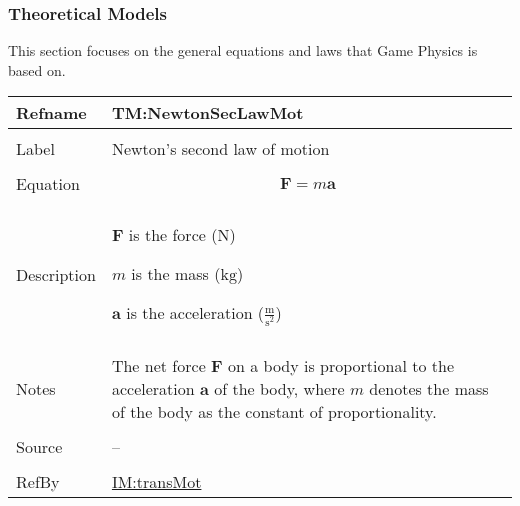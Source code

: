 \documentclass[12pt]{article}
\begin{document}
\subsubsection{Theoretical Models}
\label{Sec:TMs}
This section focuses on the general equations and laws that Game Physics is based on.

\vspace{\baselineskip}
\noindent
\begin{minipage}{\textwidth}
\begin{tabular}{>{\raggedright}p{}>{\raggedright\arraybackslash}p{}}
\toprule \textbf{Refname} & \textbf{TM:NewtonSecLawMot}
\label{TM:NewtonSecLawMot}
\\ \midrule \\
Label & Newton's second law of motion
        
\\ \midrule \\
Equation & \begin{displaymath}
           \symbf{F}=m \symbf{a}
           \end{displaymath}
\\ \midrule \\
Description & \begin{symbDescription}
              \item{$\symbf{F}$ is the force (${\text{N}}$)}
              \item{$m$ is the mass (${\text{kg}}$)}
              \item{$\symbf{a}$ is the acceleration ($\frac{\text{m}}{\text{s}^{2}}$)}
              \end{symbDescription}
\\ \midrule \\
Notes & The net force $\symbf{F}$ on a body is proportional to the acceleration $\symbf{a}$ of the body, where $m$ denotes the mass of the body as the constant of proportionality.
        
\\ \midrule \\
Source & --
         
\\ \midrule \\
RefBy & \hyperref[IM:transMot]{IM:transMot}
        
\\ \bottomrule
\end{tabular}
\end{minipage}
\vspace{\baselineskip}
\end{document}
